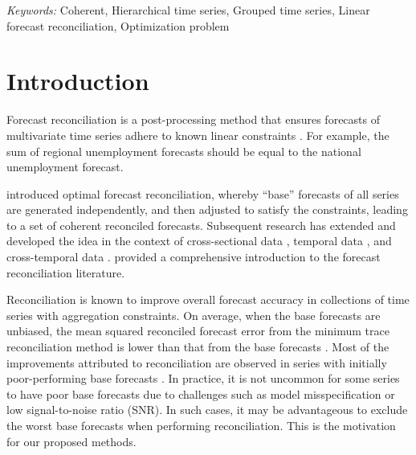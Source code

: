 \documentclass[
  11pt]{article}
\begin{document}
\noindent%
{\it Keywords:} Coherent, Hierarchical time series, Grouped time series,
Linear forecast reconciliation, Optimization problem
\vfill

\newpage
\ifdefined\Shaded\renewenvironment{Shaded}{\begin{tcolorbox}[frame hidden, borderline west={3pt}{0pt}{shadecolor}, breakable, interior hidden, boxrule=0pt, enhanced, sharp corners]}{\end{tcolorbox}}\fi

\hypertarget{sec-introduction}{%
\section{Introduction}\label{sec-introduction}}

Forecast reconciliation is a post-processing method that ensures
forecasts of multivariate time series adhere to known linear constraints
\citep{Hyndman2011-sd}. For example, the sum of regional unemployment
forecasts should be equal to the national unemployment forecast.

\citet{Hyndman2011-sd} introduced optimal forecast reconciliation,
whereby ``base'' forecasts of all series are generated independently,
and then adjusted to satisfy the constraints, leading to a set of
coherent reconciled forecasts. Subsequent research has extended and
developed the idea in the context of cross-sectional data
\citep{Hyndman2016-cz, Wickramasuriya2019-fc, Panagiotelis2021-mf},
temporal data \citep{Athanasopoulos2017-jj}, and cross-temporal data
\citep{Di_Fonzo2023-vo}. \citet{Athanasopoulos2023-sm} provided a
comprehensive introduction to the forecast reconciliation literature.

Reconciliation is known to improve overall forecast accuracy in
collections of time series with aggregation constraints. On average,
when the base forecasts are unbiased, the mean squared reconciled
forecast error from the minimum trace reconciliation method
\citep{Wickramasuriya2019-fc} is lower than that from the base forecasts
\citep{Wickramasuriya2021-am}. Most of the improvements attributed to
reconciliation are observed in series with initially poor-performing
base forecasts \citep{Athanasopoulos2017-jj}. In practice, it is not
uncommon for some series to have poor base forecasts due to challenges
such as model misspecification or low signal-to-noise ratio (SNR). In
such cases, it may be advantageous to exclude the worst base forecasts
when performing reconciliation. This is the motivation for our proposed
methods.
\end{document}
